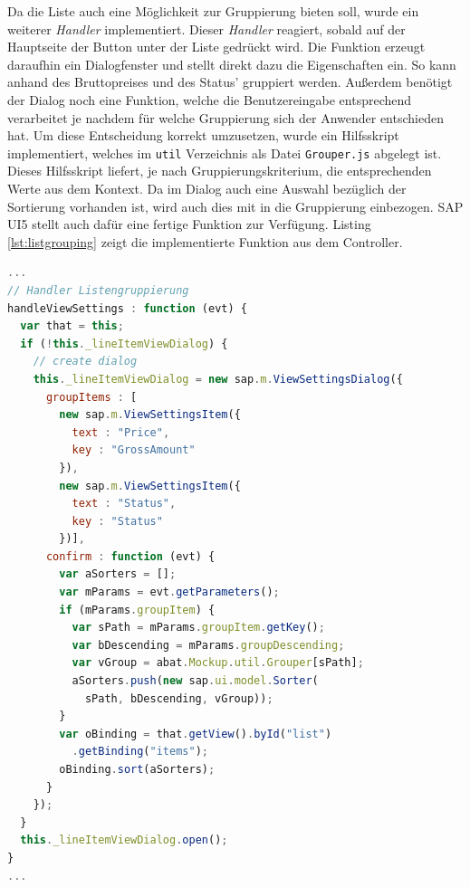 Da die Liste auch eine Möglichkeit zur Gruppierung bieten soll, wurde ein weiterer \textit{Handler} implementiert. Dieser \textit{Handler} reagiert, sobald auf der Hauptseite der Button unter der Liste gedrückt wird. Die Funktion erzeugt daraufhin ein Dialogfenster und stellt direkt dazu die Eigenschaften ein. So kann anhand des Bruttopreises und des Status' gruppiert werden. Außerdem benötigt der Dialog noch eine Funktion, welche die Benutzereingabe entsprechend verarbeitet je nachdem für welche Gruppierung sich der Anwender entschieden hat. Um diese Entscheidung korrekt umzusetzen, wurde ein Hilfsskript implementiert, welches im \texttt{util} Verzeichnis als Datei \texttt{Grouper.js} abgelegt ist. Dieses Hilfsskript liefert, je nach Gruppierungskriterium, die entsprechenden Werte aus dem Kontext. Da im Dialog auch eine Auswahl bezüglich der Sortierung vorhanden ist, wird auch dies mit in die Gruppierung einbezogen. SAP UI5 stellt auch dafür eine fertige Funktion zur Verfügung. Listing \ref{lst:listgrouping} zeigt die implementierte Funktion aus dem Controller.

\vspace{1em}
\begin{lstlisting}[language=JavaScript, caption=Handler der Listengruppierung, label=lst:listgrouping]
...
// Handler Listengruppierung
handleViewSettings : function (evt) {
  var that = this;
  if (!this._lineItemViewDialog) {
    // create dialog
    this._lineItemViewDialog = new sap.m.ViewSettingsDialog({
      groupItems : [
        new sap.m.ViewSettingsItem({
          text : "Price",
          key : "GrossAmount"
        }),
        new sap.m.ViewSettingsItem({
          text : "Status",
          key : "Status"
        })],
      confirm : function (evt) {
        var aSorters = [];
        var mParams = evt.getParameters();
        if (mParams.groupItem) {
          var sPath = mParams.groupItem.getKey();
          var bDescending = mParams.groupDescending;
       	  var vGroup = abat.Mockup.util.Grouper[sPath];
       	  aSorters.push(new sap.ui.model.Sorter(
       	    sPath, bDescending, vGroup));
        }
        var oBinding = that.getView().byId("list")
          .getBinding("items");
        oBinding.sort(aSorters);
      }
    });
  }
  this._lineItemViewDialog.open();
}
...
\end{lstlisting}

